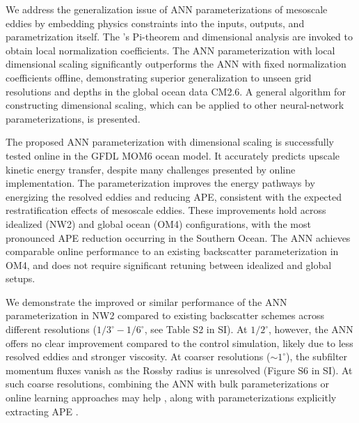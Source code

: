 \documentclass[draft]{agujournal2019}
\begin{document}
We address the generalization issue of ANN parameterizations of mesoscale eddies by embedding physics constraints into the inputs, outputs, and parametrization itself. The 's Pi-theorem and dimensional analysis are invoked to obtain local normalization coefficients. The ANN parameterization with local dimensional scaling significantly outperforms the ANN with fixed normalization coefficients offline, demonstrating superior generalization to unseen grid resolutions and depths in the global ocean data CM2.6. A general algorithm for constructing dimensional scaling, which can be applied to other neural-network parameterizations, is presented.

The proposed ANN parameterization with dimensional scaling is successfully tested online in the GFDL MOM6 ocean model. It accurately predicts upscale kinetic energy transfer, despite many challenges presented by online implementation. The parameterization improves the energy pathways by energizing the resolved eddies and reducing APE, consistent with the expected restratification effects of mesoscale eddies. These improvements hold across idealized (NW2) and global ocean (OM4) configurations, with the most pronounced APE reduction occurring in the Southern Ocean. The ANN achieves comparable online performance to an existing backscatter parameterization \cite{jansen2015energy, chang2023remote} in OM4, and does not require significant retuning between idealized and global setups.

We demonstrate the improved or similar performance of the ANN parameterization in NW2 compared to existing backscatter schemes \cite{yankovsky2024, perezhogin2024stable} across different resolutions ($1/3^\circ-1/6^\circ$, see Table S2 in SI). At $1/2^\circ$, however, the ANN offers no clear improvement compared to the control simulation, likely due to less resolved eddies and stronger viscosity. At coarser resolutions ($\sim1^\circ$),  the subfilter momentum fluxes vanish as the Rossby radius is unresolved (Figure S6 in SI). At such coarse resolutions, combining the ANN with bulk parameterizations or online learning approaches may help \cite{maddison2024online, shankar2025differentiable}, along with parameterizations explicitly extracting APE \cite{bachman2019gm, jansen2019toward, grooms2024stochastic, perezhogin2025large, balwada2025design}.
\end{document}
